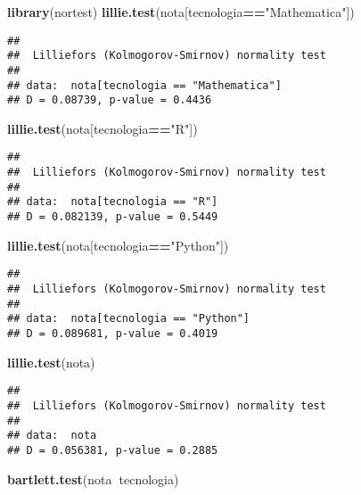 \documentclass[
]{article}
\newenvironment{Shaded}{\begin{snugshade}}{\end{snugshade}}
\newcommand{\KeywordTok}[1]{\textcolor[rgb]{0.13,0.29,0.53}{\textbf{#1}}}
\newcommand{\NormalTok}[1]{#1}
\newcommand{\OperatorTok}[1]{\textcolor[rgb]{0.81,0.36,0.00}{\textbf{#1}}}
\newcommand{\StringTok}[1]{\textcolor[rgb]{0.31,0.60,0.02}{#1}}
\begin{document}
\begin{Shaded}
\begin{Highlighting}[]
\KeywordTok{library}\NormalTok{(nortest)}
\KeywordTok{lillie.test}\NormalTok{(nota[tecnologia}\OperatorTok{==}\StringTok{"Mathematica"}\NormalTok{])}
\end{Highlighting}
\end{Shaded}

\begin{verbatim}
## 
##  Lilliefors (Kolmogorov-Smirnov) normality test
## 
## data:  nota[tecnologia == "Mathematica"]
## D = 0.08739, p-value = 0.4436
\end{verbatim}

\begin{Shaded}
\begin{Highlighting}[]
\KeywordTok{lillie.test}\NormalTok{(nota[tecnologia}\OperatorTok{==}\StringTok{"R"}\NormalTok{])}
\end{Highlighting}
\end{Shaded}

\begin{verbatim}
## 
##  Lilliefors (Kolmogorov-Smirnov) normality test
## 
## data:  nota[tecnologia == "R"]
## D = 0.082139, p-value = 0.5449
\end{verbatim}

\begin{Shaded}
\begin{Highlighting}[]
\KeywordTok{lillie.test}\NormalTok{(nota[tecnologia}\OperatorTok{==}\StringTok{"Python"}\NormalTok{])}
\end{Highlighting}
\end{Shaded}

\begin{verbatim}
## 
##  Lilliefors (Kolmogorov-Smirnov) normality test
## 
## data:  nota[tecnologia == "Python"]
## D = 0.089681, p-value = 0.4019
\end{verbatim}

\begin{Shaded}
\begin{Highlighting}[]
\KeywordTok{lillie.test}\NormalTok{(nota)}
\end{Highlighting}
\end{Shaded}

\begin{verbatim}
## 
##  Lilliefors (Kolmogorov-Smirnov) normality test
## 
## data:  nota
## D = 0.056381, p-value = 0.2885
\end{verbatim}

\begin{Shaded}
\begin{Highlighting}[]
\KeywordTok{bartlett.test}\NormalTok{(nota}\OperatorTok{~}\NormalTok{tecnologia)}
\end{Highlighting}
\end{Shaded}
\end{document}
